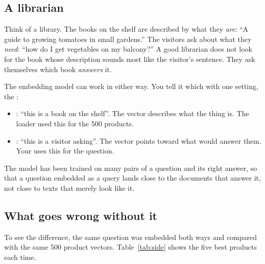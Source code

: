 \documentclass[11pt]{article}
\begin{document}
\subsection{A librarian}

Think of a library. The books on the shelf are described by what they
\emph{are}: ``A guide to growing tomatoes in small gardens.'' The
visitors ask about what they \emph{need}: ``how do I get vegetables on
my balcony?'' A good librarian does not look for the book whose
description sounds most like the visitor's sentence. They ask
themselves which book \emph{answers} it.

The embedding model can work in either way. You tell it which with one
setting, the :
\begin{itemize}[leftmargin=1.4em, itemsep=2pt]
\item {}: ``this is a book on the shelf''.
  The vector describes what the thing is. The loader used this for the
  500 products.
\item {}: ``this is a visitor asking''. The vector
  points toward what would answer them. Your  uses
  this for the question.
\end{itemize}
The model has been trained on many pairs of a question and its right
answer, so that a question embedded as a query lands close to the
documents that answer it, not close to texts that merely look like it.

\subsection{What goes wrong without it}

To see the difference, the same question was embedded both ways and
compared with the same 500 product vectors. Table~\ref{tab:side} shows
the five best products each time.
\end{document}
